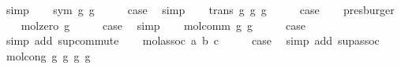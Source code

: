 \begin{isabellebody}
\ simp\isanewline
{}\isamarkupfalse%
\isanewline
\ \ \isamarkupfalse%
\ {\isacharparenleft}{\kern0pt}sym\ g{}\ g{}{\isacharparenright}{\kern0pt}\isanewline
\ \ \isamarkupfalse%
\ \isamarkupfalse%
\ {\isacharquery}{\kern0pt}case\ \isamarkupfalse%
\ simp\isanewline
{}\isamarkupfalse%
\isanewline
\ \ \isamarkupfalse%
\ {\isacharparenleft}{\kern0pt}trans\ g{}\ g{}\ g{}{\isacharparenright}{\kern0pt}\isanewline
\ \ \isamarkupfalse%
\ \isamarkupfalse%
\ {\isacharquery}{\kern0pt}case\isanewline
\ \ \isamarkupfalse%
\ presburger\isanewline
{}\isamarkupfalse%
\isanewline
\ \ \isamarkupfalse%
\ {\isacharparenleft}{\kern0pt}mol{\isacharunderscore}{\kern0pt}zero\ g{\isacharparenright}{\kern0pt}\isanewline
\ \ \isamarkupfalse%
\ \isamarkupfalse%
\ {\isacharquery}{\kern0pt}case\ \isamarkupfalse%
\ simp\isanewline
{}\isamarkupfalse%
\isanewline
\ \ \isamarkupfalse%
\ {\isacharparenleft}{\kern0pt}mol{\isacharunderscore}{\kern0pt}comm\ g{}\ g{}{\isacharparenright}{\kern0pt}\isanewline
\ \ \isamarkupfalse%
\ \isamarkupfalse%
\ {\isacharquery}{\kern0pt}case\isanewline
\ \ \isamarkupfalse%
\ {\isacharparenleft}{\kern0pt}simp\ add{\isacharcolon}{\kern0pt}\ sup{\isacharunderscore}{\kern0pt}commute{\isacharparenright}{\kern0pt}\isanewline
{}\isamarkupfalse%
\isanewline
\ \ \isamarkupfalse%
\ {\isacharparenleft}{\kern0pt}mol{\isacharunderscore}{\kern0pt}assoc\ a\ b\ c{\isacharparenright}{\kern0pt}\isanewline
\ \ \isamarkupfalse%
\ \isamarkupfalse%
\ {\isacharquery}{\kern0pt}case\ \isamarkupfalse%
\ {\isacharparenleft}{\kern0pt}simp\ add{\isacharcolon}{\kern0pt}\ sup{\isacharunderscore}{\kern0pt}assoc{\isacharparenright}{\kern0pt}\isanewline
{}\isamarkupfalse%
\isanewline
\ \ \isamarkupfalse%
\ {\isacharparenleft}{\kern0pt}mol{\isacharunderscore}{\kern0pt}cong\ g{}\ g{}\ g{}{\isacharprime}{\kern0pt}\ g{}{\isacharprime}{\kern0pt}{\isacharparenright}{\kern0pt}\isanewline
\ \ \isamarkupfalse%
\ \isamarkupfalse%

\end{isabellebody}
